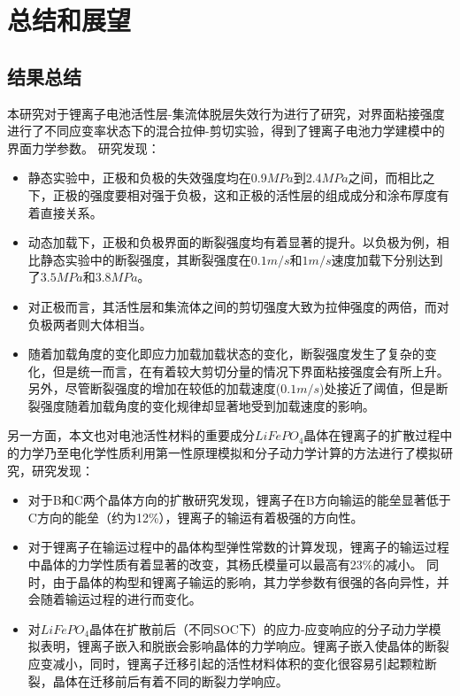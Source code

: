 \chapter{总结和展望}
\section{结果总结}
本研究对于锂离子电池活性层-集流体脱层失效行为进行了研究，对界面粘接强度进行了不同应变率状态下的混合拉伸-剪切实验，得到了锂离子电池力学建模中的界面力学参数。 研究发现：
\begin{itemize}
	\item 静态实验中，正极和负极的失效强度均在0.9$MPa$到2.4$MPa$之间，而相比之下，正极的强度要相对强于负极，这和正极的活性层的组成成分和涂布厚度有着直接关系。
	\item 动态加载下，正极和负极界面的断裂强度均有着显著的提升。以负极为例，相比静态实验中的断裂强度，其断裂强度在$0.1m/s$和$1m/s$速度加载下分别达到了$3.5MPa$和$3.8MPa$。
	\item 对正极而言，其活性层和集流体之间的剪切强度大致为拉伸强度的两倍，而对负极两者则大体相当。
	\item 随着加载角度的变化即应力加载加载状态的变化，断裂强度发生了复杂的变化，但是统一而言，在有着较大剪切分量的情况下界面粘接强度会有所上升。 另外，尽管断裂强度的增加在较低的加载速度($0.1m/s$)处接近了阈值，但是断裂强度随着加载角度的变化规律却显著地受到加载速度的影响。
\end{itemize}
\indent 另一方面，本文也对电池活性材料的重要成分$LiFePO_4$晶体在锂离子的扩散过程中的力学乃至电化学性质利用第一性原理模拟和分子动力学计算的方法进行了模拟研究，研究发现：
\begin{itemize}
	\item 对于B和C两个晶体方向的扩散研究发现，锂离子在B方向输运的能垒显著低于C方向的能垒（约为12\%），锂离子的输运有着极强的方向性。 
	\item 对于锂离子在输运过程中的晶体构型弹性常数的计算发现，锂离子的输运过程中晶体的力学性质有着显著的改变，其杨氏模量可以最高有23\%的减小。 同时，由于晶体的构型和锂离子输运的影响，其力学参数有很强的各向异性，并会随着输运过程的进行而变化。
	\item 对$LiFePO_4$晶体在扩散前后（不同SOC下）的应力-应变响应的分子动力学模拟表明，锂离子嵌入和脱嵌会影响晶体的力学响应。锂离子嵌入使晶体的断裂应变减小，同时，锂离子迁移引起的活性材料体积的变化很容易引起颗粒断裂，晶体在迁移前后有着不同的断裂力学响应。

\end{itemize}
